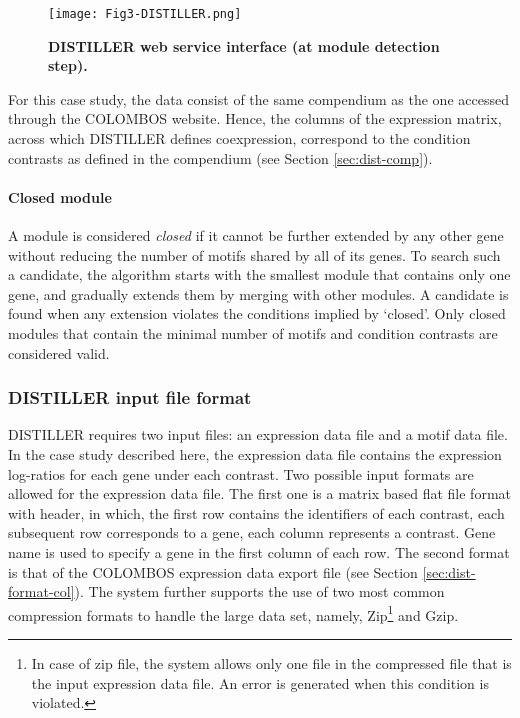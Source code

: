 \begin{figure}[tb]
	\centering
  	\texttt{[image: Fig3-DISTILLER.png]}
	\caption[DISTILLER web service interface]{\textbf{DISTILLER web service 
	interface (at module detection step).}}
	\label{fig:distiller}
\end{figure}

For this case study, the data consist of the same compendium as the one accessed through the COLOMBOS website. Hence, the columns of the expression matrix, across which DISTILLER defines coexpression, correspond to the condition contrasts as defined in the compendium (see Section \ref{sec:dist-comp}). 

\paragraph{Closed module}
A module is considered \textit{closed} if it cannot be further extended by any other gene without reducing the number of motifs shared by all of its genes. To search such a candidate, the algorithm \cite{Lemmens2009} starts with the smallest module that contains only one gene, and gradually extends them by merging with other modules. A candidate is found when any extension violates the conditions implied by `closed'.  Only closed modules that contain the minimal number of motifs and condition contrasts are considered valid. %



\subsubsection{DISTILLER input file format}\label{sec:distiller-infile-format}
DISTILLER requires two input files: an expression data file and a motif data file. In the case study described here, the expression data file contains the expression log-ratios for each gene under each contrast.  Two possible input formats are allowed for the expression data file.  The first one is a matrix based flat file format with header, in which, the first row contains the identifiers of each contrast, each subsequent row corresponds to a gene, each column represents a contrast.  Gene name is used to specify a gene in the first column of each row. The second format is that of the COLOMBOS expression data export file (see Section \ref{sec:dist-format-col}).   The system further supports the use of two most common compression formats to handle the large data set, namely, Zip\footnote{In case of zip file, the system allows only one file in the compressed file that is the input expression data file. An error is generated when this condition is violated.} and Gzip.


